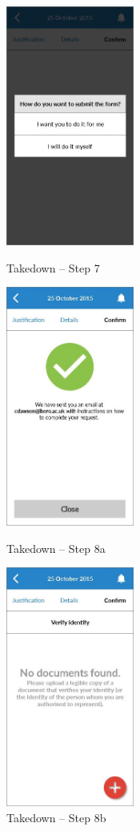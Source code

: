 \begin{figure}
  \subfigures
  \centering
  \begin{minipage}{4.6cm}
    \centering
    \includegraphics[width=4.2cm]{inc/ui_takedown_step7.jpg}
    \caption{Takedown -- Step 7}
    \label{fig:ui_takedown_step7}
  \end{minipage}
  \begin{minipage}{4.6cm}
    \centering
    \includegraphics[width=4.2cm]{inc/ui_takedown_step8a.jpg}
    \caption{Takedown -- Step 8a}
    \label{fig:ui_takedown_step8a}
  \end{minipage}
  \begin{minipage}{4.6cm}
    \centering
    \includegraphics[width=4.2cm]{inc/ui_takedown_step8b.jpg}
    \caption{Takedown -- Step 8b}
    \label{fig:ui_takedown_step8b}
  \end{minipage}
\end{figure}

